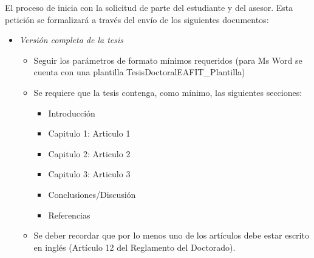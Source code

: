 El proceso de inicia con la solicitud de parte del estudiante y del asesor. Esta petición se formalizará a través del envío de los siguientes documentos:

\begin{itemize}
    \item \emph{Versión completa de la tesis}
        \begin{itemize}
            \item Seguir los parámetros de formato mínimos requeridos (para Ms Word se cuenta con una plantilla TesisDoctoralEAFIT\_Plantilla)
            \item Se requiere que la tesis contenga, como mínimo, las siguientes secciones:
            \begin{itemize}
                \item Introducción 
                \item Capitulo 1: Articulo 1
                \item Capitulo 2: Articulo 2
                \item Capitulo 3: Articulo 3
                \item Conclusiones/Discusión
                \item Referencias
            \end{itemize}
            \item Se deber recordar que por lo menos uno de los artículos debe estar escrito en inglés (Artículo 12 del Reglamento del Doctorado).
        \end{itemize}   
        

\end{itemize}
